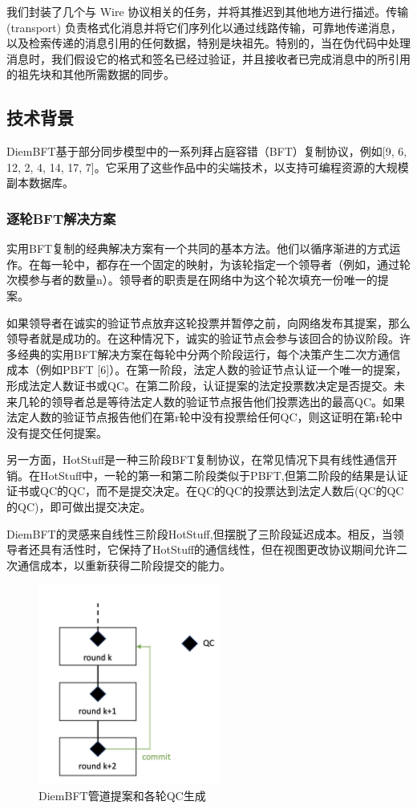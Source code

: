 我们封装了几个与 Wire 协议相关的任务，并将其推迟到其他地方进行描述。传输(transport) 负责格式化消息并将它们序列化以通过线路传输，可靠地传递消息，以及检索传递的消息引用的任何数据，特别是块祖先。特别的，当在伪代码中处理消息时，我们假设它的格式和签名已经过验证，并且接收者已完成消息中的所引用的祖先块和其他所需数据的同步。

\subsection{技术背景}

DiemBFT基于部分同步模型中的一系列拜占庭容错（BFT）复制协议，例如[9, 6, 12, 2, 4, 14, 17, 7]。它采用了这些作品中的尖端技术，以支持可编程资源的大规模副本数据库。

\subsubsection{逐轮BFT解决方案}

实用BFT复制的经典解决方案有一个共同的基本方法。他们以循序渐进的方式运作。在每一轮中，都存在一个固定的映射，为该轮指定一个领导者（例如，通过轮次模参与者的数量n）。领导者的职责是在网络中为这个轮次填充一份唯一的提案。

如果领导者在诚实的验证节点放弃这轮投票并暂停之前，向网络发布其提案，那么领导者就是成功的。在这种情况下，诚实的验证节点会参与该回合的协议阶段。许多经典的实用BFT解决方案在每轮中分两个阶段运行，每个决策产生二次方通信成本（例如PBFT [6]）。在第一阶段，法定人数的验证节点认证一个唯一的提案，形成法定人数证书或QC。在第二阶段，认证提案的法定投票数决定是否提交。未来几轮的领导者总是等待法定人数的验证节点报告他们投票选出的最高QC。如果法定人数的验证节点报告他们在第r轮中没有投票给任何QC，则这证明在第r轮中没有提交任何提案。

另一方面，HotStuff是一种三阶段BFT复制协议，在常见情况下具有线性通信开销。在HotStuff中，一轮的第一和第二阶段类似于PBFT,但第二阶段的结果是认证证书或QC的QC，而不是提交决定。在QC的QC的投票达到法定人数后(QC的QC的QC)，即可做出提交决定。

DiemBFT的灵感来自线性三阶段HotStuff,但摆脱了三阶段延迟成本。相反，当领导者还具有活性时，它保持了HotStuff的通信线性，但在视图更改协议期间允许二次通信成本，以重新获得二阶段提交的能力。

\begin{figure}[htbp]
    \centering
    \includegraphics[width=6cm]{figures/image1.jpg}
    \caption{DiemBFT管道提案和各轮QC生成}
    \label{image1}
\end{figure}


